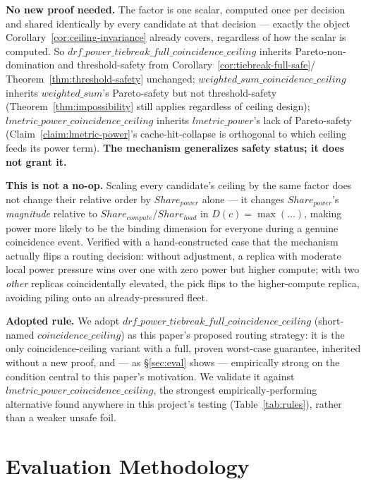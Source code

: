 \documentclass[sigconf,review,anonymous]{acmart}
\begin{document}
\textbf{No new proof needed.} The factor is one scalar, computed once per decision and shared
identically by every candidate at that decision --- exactly the object
Corollary~\ref{cor:ceiling-invariance} already covers, regardless of how the scalar is
computed. So $\mathit{drf\_power\_tiebreak\_full\_coincidence\_ceiling}$ inherits
Pareto-non-domination and threshold-safety from Corollary~\ref{cor:tiebreak-full-safe}/
Theorem~\ref{thm:threshold-safety} unchanged; $\mathit{weighted\_sum\_coincidence\_ceiling}$
inherits $\mathit{weighted\_sum}$'s Pareto-safety but not threshold-safety
(Theorem~\ref{thm:impossibility} still applies regardless of ceiling design);
$\mathit{lmetric\_power\_coincidence\_ceiling}$ inherits $\mathit{lmetric\_power}$'s lack of
Pareto-safety (Claim~\ref{claim:lmetric-power}'s cache-hit-collapse is orthogonal to which
ceiling feeds its power term). \textbf{The mechanism generalizes safety status; it does not
grant it.}

\textbf{This is not a no-op.} Scaling every candidate's ceiling by the same factor does not
change their relative order by $\mathit{Share_{power}}$ alone --- it changes
$\mathit{Share_{power}}$'s \emph{magnitude} relative to
$\mathit{Share_{compute}}$/$\mathit{Share_{load}}$ in $D(c) = \max(\ldots)$, making power more
likely to be the binding dimension for everyone during a genuine coincidence event. Verified
with a hand-constructed case that the mechanism actually flips a routing decision: without
adjustment, a replica with moderate local power pressure wins over one with zero power but
higher compute; with two \emph{other} replicas coincidentally elevated, the pick flips to the
higher-compute replica, avoiding piling onto an already-pressured fleet.

\textbf{Adopted rule.} We adopt $\mathit{drf\_power\_tiebreak\_full\_coincidence\_ceiling}$
(short-named $\mathit{coincidence\_ceiling}$) as this paper's proposed routing strategy: it is
the only coincidence-ceiling variant with a full, proven worst-case guarantee, inherited
without a new proof, and --- as \S\ref{sec:eval} shows --- empirically strong on the condition
central to this paper's motivation. We validate it against
$\mathit{lmetric\_power\_coincidence\_ceiling}$, the strongest empirically-performing
alternative found anywhere in this project's testing (Table~\ref{tab:rules}), rather than a
weaker unsafe foil.

\vspace{-3pt}
\section{Evaluation Methodology}
\label{sec:methodology}
\end{document}

